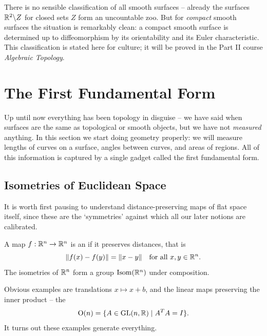 \documentclass[a4paper]{scrartcl}
\DeclareMathOperator{\Isom}{Isom}
\begin{document}
\begin{remark}
    There is no sensible classification of all smooth surfaces -- already the surfaces $\mathbb{R}^2 \backslash Z$ for closed sets $Z$ form an uncountable zoo. But for \emph{compact} smooth surfaces the situation is remarkably clean: a compact smooth surface is determined up to diffeomorphism by its orientability and its Euler characteristic. This classification is stated here for culture; it will be proved in the Part II course \emph{Algebraic Topology}.
\end{remark}

\section{The First Fundamental Form}

Up until now everything has been topology in disguise -- we have said when surfaces are the same as topological or smooth objects, but we have not \emph{measured} anything. In this section we start doing geometry properly: we will measure lengths of curves on a surface, angles between curves, and areas of regions. All of this information is captured by a single gadget called the first fundamental form.

\subsection{Isometries of Euclidean Space}

It is worth first pausing to understand distance-preserving maps of flat space itself, since these are the `symmetries' against which all our later notions are calibrated.

\begin{definition}[Isometry]
    A map $f: \mathbb{R}^n \rightarrow \mathbb{R}^n$ is an  if it preserves distances, that is
    $$
    \|f(x) - f(y)\| = \|x - y\| \quad \text{for all } x, y \in \mathbb{R}^n.
    $$
    The isometries of $\mathbb{R}^n$ form a group $\Isom(\R^n)$ under composition.
\end{definition}

Obvious examples are translations $x \mapsto x + b$, and the linear maps preserving the inner product -- the 
$$
\operatorname{O}(n) = \{A \in \operatorname{GL}(n, \mathbb{R}) \mid A^T A = I\}.
$$
It turns out these examples generate everything.
\end{document}
